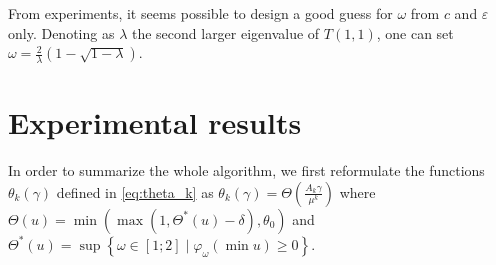 \documentclass{article} %
\DeclareMathOperator{\IR}{\mathbb{R}}
\DeclareMathOperator{\Ccal}{\mathcal{C}}
\DeclareMathOperator{\diag}{diag}
\renewcommand{\epsilon}{\varepsilon}
\theoremstyle{plain}
\theoremstyle{definition}
\theoremstyle{remark}
\begin{document}
From experiments, it seems possible to design a good guess for $\omega$ from $c$ and $\epsilon$ only. 
    Denoting as $\lambda$ the second larger eigenvalue of $T(1,1)$, one can set 
    $\omega=\frac{2}{\lambda}(1-\sqrt{1-\lambda})$.
    
    
    
\section{Experimental results}



\renewcommand{\algorithmiccomment}[1]{\hfill\bgroup(#1)\egroup}
In order to summarize the whole algorithm, we first reformulate the functions $\theta_k(\gamma)$ defined in \eqref{eq:theta_k} as $\theta_k(\gamma)=\Theta(\frac{A_k \gamma}{\mu^k})$ where 
$ \Theta(u) = \min(\max(1,\Theta^*(u)-\delta),\theta_0)$ and  $\Theta^*(u)=\sup \left\{\omega \in [1;2]  \mid \varphi_\omega\left(\min u \right) \ge 0 \right\}$.
\end{document}
